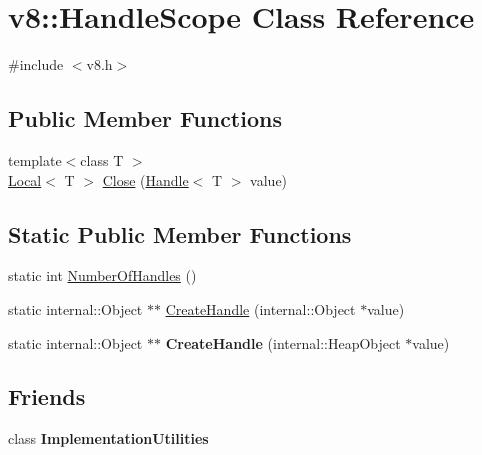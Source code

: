 \hypertarget{classv8_1_1_handle_scope}{}\section{v8\+:\+:Handle\+Scope Class Reference}
\label{classv8_1_1_handle_scope}


{\ttfamily \#include $<$v8.\+h$>$}

\subsection*{Public Member Functions}
\begin{DoxyCompactItemize}
\item 
{\footnotesize template$<$class T $>$ }\\\hyperlink{classv8_1_1_local}{Local}$<$ T $>$ \hyperlink{classv8_1_1_handle_scope_af18b68b6b149e69a05873a20c6fa269c}{Close} (\hyperlink{classv8_1_1_handle}{Handle}$<$ T $>$ value)
\end{DoxyCompactItemize}
\subsection*{Static Public Member Functions}
\begin{DoxyCompactItemize}
\item 
static int \hyperlink{classv8_1_1_handle_scope_abb2d32a75b0468885b7340404050604b}{Number\+Of\+Handles} ()
\item 
static internal\+::\+Object $\ast$$\ast$ \hyperlink{classv8_1_1_handle_scope_a93131ee7939a9bc52a62a1f370882906}{Create\+Handle} (internal\+::\+Object $\ast$value)
\item 
\hypertarget{classv8_1_1_handle_scope_a3c74ab114761127941531ec4ebb9952b}{}static internal\+::\+Object $\ast$$\ast$ {\bfseries Create\+Handle} (internal\+::\+Heap\+Object $\ast$value)\label{classv8_1_1_handle_scope_a3c74ab114761127941531ec4ebb9952b}

\end{DoxyCompactItemize}
\subsection*{Friends}
\begin{DoxyCompactItemize}
\item 
\hypertarget{classv8_1_1_handle_scope_ac7b520085953e146d849e05253267f72}{}class {\bfseries Implementation\+Utilities}\label{classv8_1_1_handle_scope_ac7b520085953e146d849e05253267f72}

\end{DoxyCompactItemize}


